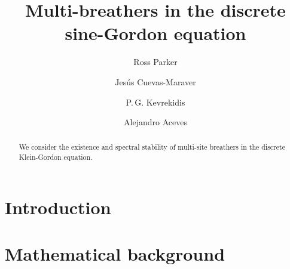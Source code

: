 \documentclass[12pt,reqno]{amsart}
\theoremstyle{definition}
\begin{document}
\title{Multi-breathers in the discrete sine-Gordon equation}

\author{Ross Parker}
\address{Department of Mathematics, Southern Methodist University, 
Dallas, TX 75275, USA}

\author{Jes\'us Cuevas-Maraver}
\address{Grupo de F\'{\i}sica No Lineal, Departamento de F\'{\i}sica Aplicada I,
Universidad de Sevilla. Escuela Polit\'{e}cnica Superior, C/ Virgen de Africa, 7, 41011-Sevilla, Spain}
\address{Instituto de Matem\'{a}ticas de la Universidad de Sevilla (IMUS). Edificio
Celestino Mutis. Avda. Reina Mercedes s/n, 41012-Sevilla, Spain, Avda Reina Mercedes s/n, E-41012 Sevilla, Spain}

\author{P.\,G. Kevrekidis} 
\address{Department of Mathematics and Statistics, University of Massachusetts, Amherst MA 01003, USA}

\author{Alejandro Aceves}
\address{Department of Mathematics, Southern Methodist University, 
Dallas, TX 75275, USA}

\begin{abstract}
	We consider the existence and spectral stability of multi-site breathers in the discrete Klein-Gordon equation.
\end{abstract}

\maketitle

\section{Introduction}

\section{Mathematical background}\label{sec:bg}
\end{document}
